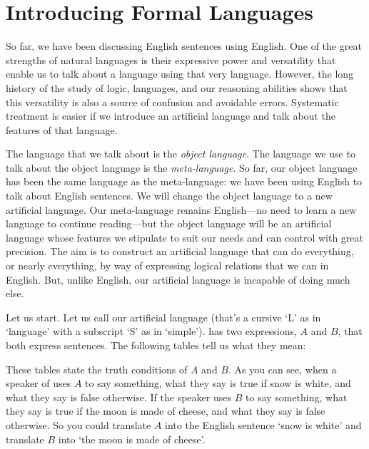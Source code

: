 
\section{Introducing Formal Languages}

So far, we have been discussing English sentences using English. One of the
great strengths of natural languages is their expressive power and versatility
that enable us to talk about a language using that very language. However, the
long history of the study of logic, languages, and our reasoning abilities shows
that this versatility is also a source of confusion and avoidable errors.
 Systematic treatment is easier if we introduce an artificial language and talk 
 about the features of that language. 

The language that we talk about is the \emph{object language}. The
language we use to talk about the object language is the \emph{meta-language}.  
So far, our object language has been the same language as the meta-language: we 
have been using English to talk about English sentences.  We will change the 
object language to a new artificial language.  Our meta-language remains 
English---no need to learn a new language to continue reading---but the object 
language will be an artificial language whose features we stipulate to suit our 
needs and can control with great precision. The aim is to construct an 
artificial language that can do everything, or nearly everything, by way of 
expressing logical relations that we can in English. But, unlike English, our 
artificial language is incapable of doing much else.

Let us start. Let us call our artificial language \lL[S]{}  (that's a cursive `L' 
as in `language' with a subscript `S' as in `simple').  \lL[S]{} has two 
expressions, $A$ and $B$, that both express sentences.  The following tables 
tell us what they mean:

\begin{center}
\end{center}

These tables state the truth conditions of $A$ and $B$. As you can see, when 
a speaker of \lL[S]{} uses $A$ to say something, what they say is true if snow is 
white, and what they say is false otherwise. If the speaker uses $B$ to say 
something, what they say is true if the moon is made of cheese, and what they 
say is false  otherwise. So you could translate $A$ into the English sentence 
`snow is white' and translate $B$ into `the moon is made of cheese'. 

